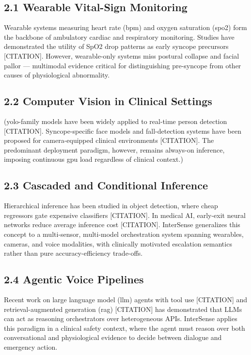 \documentclass[11pt,a4paper]{article}
\begin{document}
\subsection{2.1 Wearable Vital-Sign Monitoring}
Wearable systems measuring heart rate (\gls{bpm}) and oxygen saturation (\gls{spo2}) form the backbone of ambulatory cardiac and respiratory monitoring. Studies have demonstrated the utility of SpO2 drop patterns as early syncope precursors [CITATION]. However, wearable-only systems miss postural collapse and facial pallor — multimodal evidence critical for distinguishing pre-syncope from other causes of physiological abnormality.

\subsection{2.2 Computer Vision in Clinical Settings}
(\gls{yolo}-family models have been widely applied to real-time person detection [CITATION]. Syncope-specific face models and fall-detection systems have been proposed for camera-equipped clinical environments [CITATION]. The predominant deployment paradigm, however, remains always-on inference, imposing continuous \gls{gpu} load regardless of clinical context.)

\subsection{2.3 Cascaded and Conditional Inference}
Hierarchical inference has been studied in object detection, where cheap regressors gate expensive classifiers [CITATION]. In medical AI, early-exit neural networks reduce average inference cost [CITATION]. InterSense generalizes this concept to a multi-sensor, multi-model orchestration system spanning wearables, cameras, and voice modalities, with clinically motivated escalation semantics rather than pure accuracy-efficiency trade-offs.

\subsection{2.4 Agentic Voice Pipelines}
Recent work on large language model (\gls{llm}) agents with tool use [CITATION] and retrieval-augmented generation (\gls{rag}) [CITATION] has demonstrated that LLMs can act as reasoning orchestrators over heterogeneous APIs. InterSense applies this paradigm in a clinical safety context, where the agent must reason over both conversational and physiological evidence to decide between dialogue and emergency action.
\end{document}
